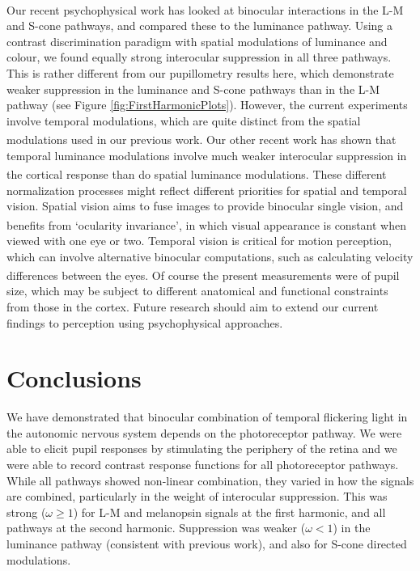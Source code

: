 \documentclass[
]{article}
\begin{document}
Our recent psychophysical work\textsuperscript{} has looked at binocular interactions in the L-M and S-cone pathways, and compared these to the luminance pathway. Using a contrast discrimination paradigm with spatial modulations of luminance and colour, we found equally strong interocular suppression in all three pathways. This is rather different from our pupillometry results here, which demonstrate weaker suppression in the luminance and S-cone pathways than in the L-M pathway (see Figure \ref{fig:FirstHarmonicPlots}). However, the current experiments involve temporal modulations, which are quite distinct from the spatial modulations used in our previous work\textsuperscript{}. Our other recent work\textsuperscript{} has shown that temporal luminance modulations involve much weaker interocular suppression in the cortical response than do spatial luminance modulations\textsuperscript{}. These different normalization processes might reflect different priorities for spatial and temporal vision. Spatial vision aims to fuse images to provide binocular single vision, and benefits from `ocularity invariance'\textsuperscript{}, in which visual appearance is constant when viewed with one eye or two. Temporal vision is critical for motion perception, which can involve alternative binocular computations, such as calculating velocity differences between the eyes\textsuperscript{}. Of course the present measurements were of pupil size, which may be subject to different anatomical and functional constraints from those in the cortex. Future research should aim to extend our current findings to perception using psychophysical approaches.

\section{Conclusions}\label{conclusions}

We have demonstrated that binocular combination of temporal flickering light in the autonomic nervous system depends on the photoreceptor pathway. We were able to elicit pupil responses by stimulating the periphery of the retina and we were able to record contrast response functions for all photoreceptor pathways. While all pathways showed non-linear combination, they varied in how the signals are combined, particularly in the weight of interocular suppression. This was strong (\(\omega \ge 1\)) for L-M and melanopsin signals at the first harmonic, and all pathways at the second harmonic. Suppression was weaker (\(\omega < 1\)) in the luminance pathway (consistent with previous work), and also for S-cone directed modulations.
\end{document}
